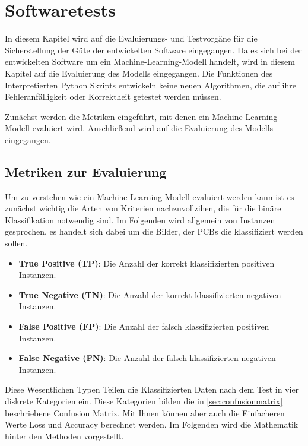 \chapter{Softwaretests} \label{chap:softwaretests}

In diesem Kapitel wird auf die Evaluierungs- und Testvorgäne für die Sicherstellung der Güte der entwickelten Software eingegangen.
Da es sich bei der entwickelten Software um ein Machine-Learning-Modell handelt, wird in diesem Kapitel auf die Evaluierung des Modells eingegangen. Die Funktionen des Interpretierten Python Skripts entwickeln keine neuen Algorithmen, die auf ihre Fehleranfälligkeit oder Korrektheit getestet werden müssen.

Zunächst werden die Metriken eingeführt, mit denen ein Machine-Learning-Modell evaluiert wird. Anschließend wird auf die Evaluierung des Modells eingegangen.

\section{Metriken zur Evaluierung} \label{sec:metriken}

Um zu verstehen wie ein Machine Learning Modell evaluiert werden kann ist es zunächst wichtig die Arten von Kriterien nachzuvollzihen, die für die binäre Klassifikation notwendig sind. Im Folgenden wird allgemein von Instanzen gesprochen, es handelt sich dabei um die Bilder, der PCBs die klassifiziert werden sollen.

\begin{itemize}
    \item \textbf{True Positive (TP)}: Die Anzahl der korrekt klassifizierten positiven Instanzen.
    \item \textbf{True Negative (TN)}: Die Anzahl der korrekt klassifizierten negativen Instanzen.
    \item \textbf{False Positive (FP)}: Die Anzahl der falsch klassifizierten positiven Instanzen.
    \item \textbf{False Negative (FN)}: Die Anzahl der falsch klassifizierten negativen Instanzen.
\end{itemize}

Diese Wesentlichen Typen Teilen die Klassifizierten Daten nach dem Test in vier diskrete Kategorien ein. Diese Kategorien bilden die 
in \autoref{sec:confusionmatrix} beschriebene Confusion Matrix. Mit Ihnen können aber auch die Einfacheren Werte Loss und Accuracy berechnet werden. Im Folgenden wird die Mathematik hinter den Methoden vorgestellt.


